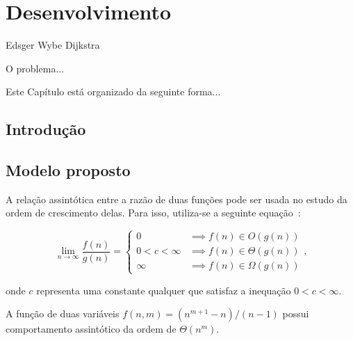 
\chapter{Desenvolvimento}
\label{cap:3:desenvolvimento}

{Edsger Wybe Dijkstra}

O problema...

Este Capítulo está organizado da seguinte forma...

\section{Introdução}
\label{sec:3:introducao}

\section{Modelo proposto}
\label{sec:3:modelo}

A relação assintótica entre a razão de duas funções pode ser usada no estudo
da ordem de crescimento delas.
Para isso, utiliza-se a seguinte
equação~\cite{brassard1996fundamentals,cormen2009algorithms}:
\begin{linenomath}
\begin{equation}\label{eq:asymtheorem}
\lim_{n\rightarrow\infty}\frac{f(n)}{g(n)}=
    \left\{
    \begin{array}{cl}
    0               & \implies f(n) \in O(g(n)) \\
    0 < c < \infty  & \implies f(n) \in \Theta(g(n)) \\
    \infty          & \implies f(n) \in \Omega(g(n)) 
    \end{array}
    \right.\text{,}
\end{equation}
\end{linenomath}
onde $c$ representa uma constante qualquer que satisfaz a inequação
$0<c<\infty$.

\begin{lema}[Comportamento assintótico de $f(n,m)=(n^{m+1}-n)/(n-1)$]
\label{lem:comptns}
A função de duas variáveis $f(n,m)=(n^{m+1}-n)/(n-1)$ possui comportamento
assintótico da ordem de $\Theta(n^m)$.
\end{lema}

